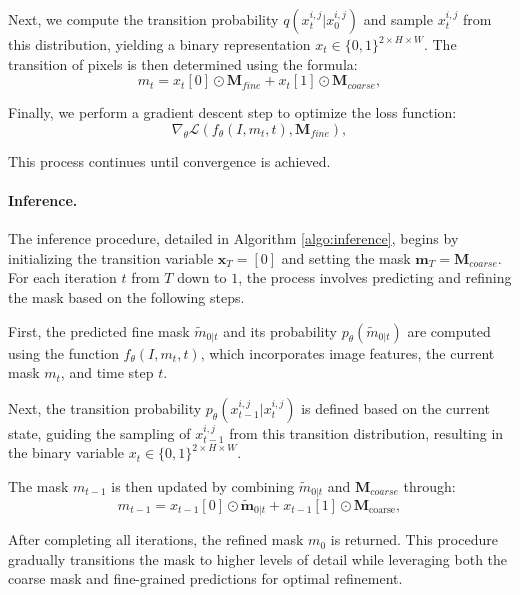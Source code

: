 Next, we compute the transition probability \( q(x_{t}^{i,j}|x_{0}^{i,j}) \) and sample \( x_{t}^{i,j} \) from this distribution, yielding a binary representation \( x_t \in \{0, 1\}^{2 \times H \times W} \). The transition of pixels is then determined using the formula:
\[
m_t = x_t[0] \odot \mathbf{M}_{fine} + x_t[1] \odot \mathbf{M}_{coarse},
\]

Finally, we perform a gradient descent step to optimize the loss function:
\[
\nabla_\theta \mathcal{L}(f_\theta(I, m_t, t), \mathbf{M}_{fine}),
\]

This process continues until convergence is achieved.

\begin{algorithm}[t]

\end{algorithm}

\paragraph{Inference.}
The inference procedure, detailed in Algorithm \ref{algo:inference}, begins by initializing the transition variable \( \mathbf{x}_T = [0] \) and setting the mask \( \mathbf{m}_T = \mathbf{M}_{coarse} \). For each iteration \( t \) from \( T \) down to \( 1 \), the process involves predicting and refining the mask based on the following steps.

First, the predicted fine mask \( \tilde m_{0|t} \) and its probability \( p_\theta(\tilde m_{0|t}) \) are computed using the function \( f_\theta(I, m_t, t) \), which incorporates image features, the current mask \( m_t \), and time step \( t \). 

Next, the transition probability \( p_\theta(x_{t-1}^{i,j}|x_{t}^{i,j}) \) is defined based on the current state, guiding the sampling of \( x_{t-1}^{i,j} \) from this transition distribution, resulting in the binary variable \( x_t \in \{0, 1\}^{2 \times H \times W} \).

The mask \( m_{t-1} \) is then updated by combining \( \tilde m_{0|t} \) and \( \mathbf{M}_{coarse} \) through:
\[
m_{t-1} = x_{t-1}[0] \odot \tilde{\mathbf{m}}_{0|t} + x_{t-1}[1] \odot \mathbf{M}_{\text{coarse}},
\]


After completing all iterations, the refined mask \( m_0 \) is returned. This procedure gradually transitions the mask to higher levels of detail while leveraging both the coarse mask and fine-grained predictions for optimal refinement.

